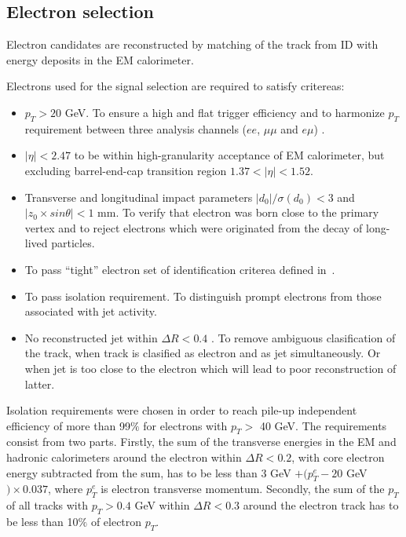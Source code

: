 \subsection{Electron selection}

Electron candidates are reconstructed by matching of the track from ID with energy deposits in the EM calorimeter.


Electrons used for the signal selection are required to satisfy critereas:
\begin{itemize}
 \item $p_T > 20$ GeV. To ensure a high and flat trigger efficiency and to harmonize $p_T$ requirement between three analysis channels ($ee$, $\mu\mu$ and $e\mu$) 
 .
 \item $|\eta|<2.47$ to be within high-granularity acceptance of EM calorimeter, but excluding barrel-end-cap transition region $1.37<|\eta|<1.52$.
 \item Transverse and longitudinal impact parameters $|d_0|/\sigma(d_0) < 3$ and $|z_0 \times sin \theta| < 1$ mm. 
 To verify that electron was born close to the primary vertex and to reject electrons which were originated from the decay of long-lived particles.
 \item To pass ``tight'' electron set of identification criterea defined in~\cite{electron_tight}. \\ 
 \item To pass isolation requirement. To distinguish prompt electrons from those associated with jet activity.
 \item No reconstructed jet within $\Delta R < 0.4$ \toFix[define R]. To remove ambiguous clasification of the track, when track is clasified as electron and as jet simultaneously. 
 Or when jet is too close to the electron which will lead to poor reconstruction of latter. 
\end{itemize}

Isolation requirements were chosen in order to reach pile-up independent efficiency of more than 99$\%$ for electrons 
with $p_T >$ 40 GeV. The requirements consist from two parts. 
Firstly, the sum of the transverse energies in the EM and hadronic calorimeters around the electron within 
$\Delta R < 0.2$, with core electron energy subtracted from the sum, has to be less than 
3 GeV $+ (p_T^e - 20$ GeV$) \times 0.037$, where $p_T^e$ is electron transverse momentum.
Secondly, the sum of the $p_T$ of all tracks with $p_T > 0.4$ GeV within $\Delta R < 0.3$ around the electron track has
to be less than 10$\%$ of electron $p_T$.

